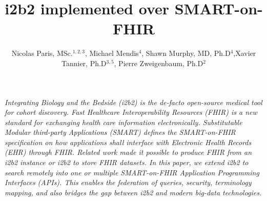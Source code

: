 \documentclass{amia}
\begin{document}
\title{i2b2 implemented over SMART-on-FHIR} 
\author{Nicolas Paris, MSc.$^{1,2,3}$, Michael Mendis$^{4}$, Shawn Murphy, MD, Ph.D$^{4}$,\newline Xavier Tannier, Ph.D$^{3,5}$, Pierre Zweigenbaum, Ph.D$^{2}$
}


\maketitle


\textit{Integrating Biology and the Bedside (i2b2) is the de-facto open-source medical tool for cohort discovery. Fast Healthcare Interoperability Resources (FHIR) is a new standard for exchanging health care information electronically. Substitutable Modular third-party Applications (SMART) defines the SMART-on-FHIR specification on how applications shall interface with Electronic Health Records (EHR) through FHIR. Related work made it possible to produce FHIR from an i2b2 instance or i2b2 to store FHIR datasets. In this paper, we extend i2b2 to search remotely into one or multiple SMART-on-FHIR Application Programming Interfaces (APIs). This enables the federation of queries, security, terminology mapping, and also bridges the gap between i2b2 and modern big-data technologies.}
\end{document}
